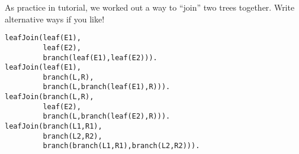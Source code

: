 \documentclass[11pt]{article}
\begin{document}
As practice in tutorial, we worked out a way to “join” two trees together.
Write alternative ways if you like!
\begin{verbatim}
leafJoin(leaf(E1),
         leaf(E2),
         branch(leaf(E1),leaf(E2))).
leafJoin(leaf(E1),
         branch(L,R),
         branch(L,branch(leaf(E1),R))).
leafJoin(branch(L,R),
         leaf(E2),
         branch(L,branch(leaf(E2),R))).
leafJoin(branch(L1,R1),
         branch(L2,R2),
         branch(branch(L1,R1),branch(L2,R2))).
\end{verbatim}
\end{document}
